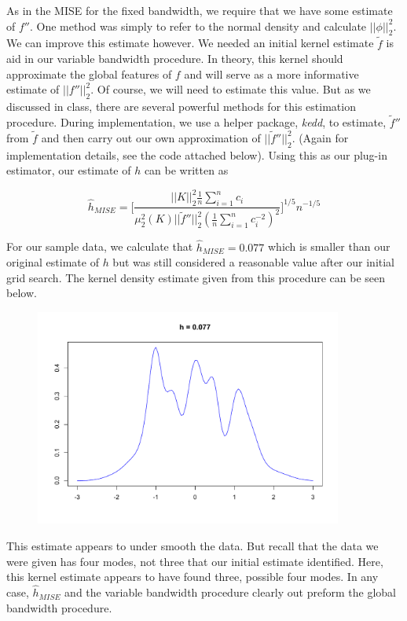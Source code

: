 \documentclass[12pt]{article}  %
\begin{document}
\begin{enumerate}
\begin{enumerate}
As in the MISE for the fixed bandwidth, we require that we have some estimate of $f''$. One method was simply to refer to the normal density and calculate $||\phi||_2^2$. We can improve this estimate however. We needed an initial kernel estimate $\widetilde{f}$ is aid in our variable bandwidth procedure. In theory, this kernel should approximate the global features of $f$ and will serve as a more informative estimate of $||f''||_2^2$. Of course, we will need to estimate this value. But as we discussed in class, there are several powerful methods for this estimation procedure. During implementation, we use a helper package, \textit{kedd}, to estimate, $\widetilde{f}''$ from $\widetilde{f}$ and then carry out our own approximation of $||\widetilde{f}''||_2^2$. (Again for implementation details, see the code attached below). Using this as our plug-in estimator, our estimate of $h$ can be written as 


$$\hat{h}_{MISE} = \bigg[\frac{||K||_2^2\frac{1}{n}\sum_{i=1}^{n}c_i}{\mu_2^2(K)||\widetilde{f}''||_2^2\left(\frac{1}{n}\sum_{i=1}^{n}c_i^{-2}\right)^2}\Big]^{1/5}n^{-1/5}$$

For our sample data, we calculate that $\hat{h}_{MISE} = 0.077$ which is smaller than our original estimate of $h$ but was still considered a reasonable value after our initial grid search. The kernel density estimate given from this procedure can be seen below. 

\begin{figure}[h!]
\centering
\includegraphics[width = 0.9\textwidth]{p6.pdf}
\end{figure}

This estimate appears to under smooth the data. But recall that the data we were given has four modes, not three that our initial estimate identified. Here, this kernel estimate appears to have found three, possible four modes. In any case, $\hat{h}_{MISE}$ and the variable bandwidth procedure clearly out preform the global bandwidth procedure. 


\end{enumerate}
\end{enumerate}
\end{document}

